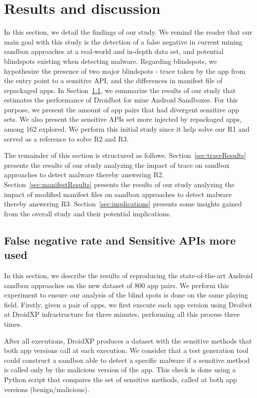 \section{Results and discussion}\label{sec:results}

In this section, we detail the findings of our study.  We remind the reader that our main goal with this study is the detection of a false negative in current mining sandbox approaches at a real-world and in-depth data set, and potential blindspots existing when detecting malware. Regarding blindspots, we hypothesize the presence of two major blindspots - trace taken by the app from the entry point to a sensitive API, and the differences in manifest file of repackaged apps. In Section~\ref{sec:Sensitive APIs}, we summarize the results of our study that estimates the performance of Droidbot for mine Android Sandboxes. For this purpose, we present the amount of app pairs that had divergent sensitive app sets. We also present the 
sensitive APIs set more injected by repackaged apps, among 162 explored. We perform this initial study since it help solve our R1 and served as a reference to solve R2 and R3.

The remainder of this section is structured as follows. Section~\ref{sec:traceResults} presents the results of our study analyzing the impact of trace on sandbox approaches to detect malware thereby answering R2. Section~\ref{sec:manifestResults} presents the results of our study analyzing the impact of modified manifest files on sandbox approaches to detect malware thereby answering R3. Section~\ref{sec:implications} presents some insights gained from the overall study and their potential implications.

\subsection{False negative rate and Sensitive APIs more used}\label{sec:Sensitive APIs}

In this section, we describe the results of reproducing the state-of-the-art Android sandbox approaches on the new dataset of $800$ app pairs. We perform this experiment to ensure our analysis of the blind spots is done on the same playing field. Firstly, given a pair of apps, we first execute each app version using Droibot at DroidXP infrastructure for three minutes, performing all this process three times.

After all executions, DroidXP produces a dataset with the sensitive methods that both app versions call at each execution. We consider that a test generation tool could construct a sandbox able to detect a specific malware if a sensitive method is called only by the malicious version of the app. This check is done using a Python script that compares the set of sensitive methods, called at both app versions (benign/malicious).

